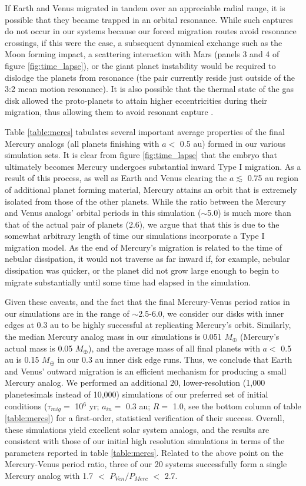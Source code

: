 \documentclass[trackchanges,twocolumn]{aastex}
\begin{document}
If Earth and Venus migrated in tandem over an appreciable radial range, it is possible that they became trapped in an orbital resonance.  While such captures do not occur in our systems because our forced migration routes avoid resonance crossings, if this were the case, a subsequent dynamical exchange such as the Moon forming impact, a scattering interaction with Mars (panels 3 and 4 of figure \ref{fig:time_lapse}), or the giant planet instability \citep{bras13,clement18} would be required to dislodge the planets from resonance (the pair currently reside just outside of the 3:2 mean motion resonance).  It is also possible that the thermal state of the gas disk allowed the proto-planets to attain higher eccentricities during their migration, thus allowing them to avoid resonant capture \citep{broz21}.

Table \ref{table:mercs} tabulates several important average properties of the final Mercury analogs (all planets finishing with $a<$ 0.5 au) formed in our various simulation sets.  It is clear from figure \ref{fig:time_lapse} that the embryo that ultimately becomes Mercury undergoes substantial inward Type I migration.  As a result of this process, as well as Earth and Venus clearing the $a\lesssim$ 0.75 au region of additional planet forming material, Mercury attains an orbit that is extremely isolated from those of the other planets.  While the ratio between the Mercury and Venus analogs' orbital periods in this simulation ($\sim$5.0) is much more than that of the actual pair of planets (2.6), we argue that that this is due to the somewhat arbitrary length of time our simulations incorporate a Type I migration model.  As the end of Mercury's migration is related to the time of nebular dissipation, it would not traverse as far inward if, for example, nebular dissipation was quicker, or the planet did not grow large enough to begin to migrate substantially until some time had elapsed in the simulation.  

Given these caveats, and the fact that the final Mercury-Venus period ratios in our simulations are in the range of $\sim$2.5-6.0, we consider our disks with inner edges at 0.3 au to be highly successful at replicating Mercury's orbit.  Similarly, the median Mercury analog mass in our simulations is 0.051 $M_{\oplus}$ (Mercury's actual mass is 0.05 $M_{\oplus}$), and the average mass of all final planets with $a<$ 0.5 au is 0.15 $M_{\oplus}$ in our 0.3 au inner disk edge runs.  Thus, we conclude that Earth and Venus' outward migration is an efficient mechanism for producing a small Mercury analog.  We performed an additional 20, lower-resolution (1,000 planetesimals instead of 10,000) simulations of our preferred set of initial conditions ($\tau_{mig}=$ 10$^{6}$ yr; $a_{in}=$ 0.3 au; $R=$ 1.0, see the bottom column of table \ref{table:mercs}) for a first-order, statistical verification of their success.  Overall, these simulations yield excellent solar system analogs, and the results are consistent with those of our initial high resolution simulations in terms of the parameters reported in table \ref{table:mercs}.   Related to the above point on the Mercury-Venus period ratio, three of our 20 systems successfully form a single Mercury analog with 1.7 $<$ $P_{Ven}/P_{Merc}$ $<$ 2.7.
\end{document}
